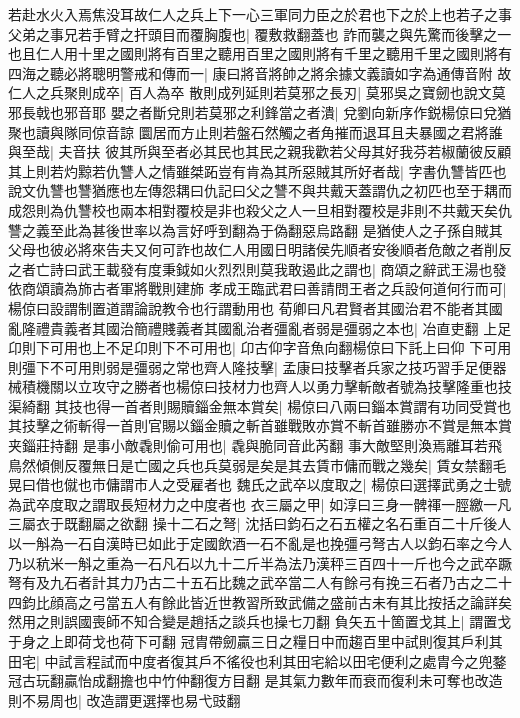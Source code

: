若赴水火入焉焦没耳故仁人之兵上下一心三軍同力臣之於君也下之於上也若子之事父弟之事兄若手臂之扞頭目而覆胸腹也|{
	覆敷救翻蓋也}
詐而襲之與先驚而後擊之一也且仁人用十里之國則將有百里之聽用百里之國則將有千里之聽用千里之國則將有四海之聽必將聰明警戒和傳而一|{
	康曰將音將帥之將余據文義讀如字為通傳音附}
故仁人之兵聚則成卒|{
	百人為卒}
散則成列延則若莫邪之長刃|{
	莫邪吳之寶劒也說文莫邪長戟也邪音耶}
嬰之者斷兌則若莫邪之利鋒當之者潰|{
	兌劉向新序作鋭楊倞曰兌猶聚也讀與隊同倞音諒}
圜居而方止則若盤石然觸之者角摧而退耳且夫暴國之君將誰與至哉|{
	夫音扶}
彼其所與至者必其民也其民之親我歡若父母其好我芬若椒蘭彼反顧其上則若灼黥若仇讐人之情雖桀跖豈有肯為其所惡賊其所好者哉|{
	字書仇讐皆匹也說文仇讐也讐猶應也左傳怨耦曰仇記曰父之讐不與共戴天蓋謂仇之初匹也至于耦而成怨則為仇讐校也兩本相對覆校是非也殺父之人一旦相對覆校是非則不共戴天矣仇讐之義至此為甚後世率以為言好呼到翻為于偽翻惡烏路翻}
是猶使人之子孫自賊其父母也彼必將來告夫又何可詐也故仁人用國日明諸侯先順者安後順者危敵之者削反之者亡詩曰武王載發有度秉鉞如火烈烈則莫我敢遏此之謂也|{
	商頌之辭武王湯也發依商頌讀為斾古者軍將戰則建斾}
孝成王臨武君曰善請問王者之兵設何道何行而可|{
	楊倞曰設謂制置道謂論說教令也行謂動用也}
荀卿曰凡君賢者其國治君不能者其國亂隆禮貴義者其國治簡禮賤義者其國亂治者彊亂者弱是彊弱之本也|{
	冶直吏翻}
上足卬則下可用也上不足卬則下不可用也|{
	卬古仰字音魚向翻楊倞曰下託上曰仰}
下可用則彊下不可用則弱是彊弱之常也齊人隆技擊|{
	孟康曰技擊者兵家之技巧習手足便器械積機關以立攻守之勝者也楊倞曰技材力也齊人以勇力擊斬敵者號為技擊隆重也技渠綺翻}
其技也得一首者則賜贖錙金無本賞矣|{
	楊倞曰八兩曰錙本賞謂有功同受賞也其技擊之術斬得一首則官賜以錙金贖之斬首雖戰敗亦賞不斬首雖勝亦不賞是無本賞夹錙莊持翻}
是事小敵毳則偷可用也|{
	毳與脆同音此芮翻}
事大敵堅則渙焉離耳若飛鳥然傾側反覆無日是亡國之兵也兵莫弱是矣是其去賃市傭而戰之幾矣|{
	賃女禁翻毛晃曰借也僦也市傭謂市人之受雇者也}
魏氏之武卒以度取之|{
	楊倞曰選擇武勇之士號為武卒度取之謂取長短材力之中度者也}
衣三屬之甲|{
	如淳曰三身一髀禈一脛繳一凡三屬衣于既翻屬之欲翻}
操十二石之弩|{
	沈括曰鈞石之石五權之名石重百二十斤後人以一斛為一石自漢時已如此于定國飲酒一石不亂是也挽彊弓弩古人以鈞石率之今人乃以秔米一斛之重為一石凡石以九十二斤半為法乃漢秤三百四十一斤也今之武卒蹶弩有及九石者計其力乃古二十五石比魏之武卒當二人有餘弓有挽三石者乃古之二十四鈞比顔高之弓當五人有餘此皆近世教習所致武備之盛前古未有其比按括之論詳矣然用之則誤國喪師不知合變是趙括之談兵也操七刀翻}
負矢五十箇置戈其上|{
	謂置戈于身之上即荷戈也荷下可翻}
冠胄帶劒贏三日之糧日中而趨百里中試則復其戶利其田宅|{
	中試言程試而中度者復其戶不徭役也利其田宅給以田宅便利之處胄今之兜鍪冠古玩翻贏怡成翻擔也中竹仲翻復方目翻}
是其氣力數年而衰而復利未可奪也改造則不易周也|{
	改造謂更選擇也易弋豉翻}
